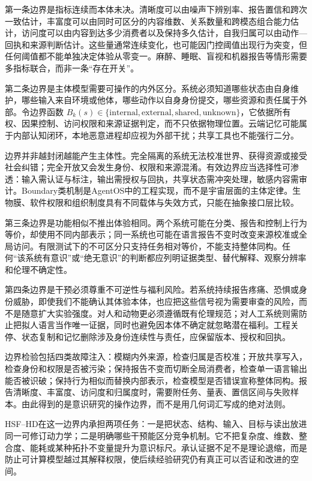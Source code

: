 第一条边界是指标连续而本体未决。清晰度可以由噪声下辨别率、报告置信和跨次一致估计，丰富度可以由同时可区分的内容维数、关系数量和跨模态组合能力估计，访问度可以由内容到达多少消费者以及保持多久估计，自我归属可以由动作—回执和来源判断估计。这些量通常连续变化，也可能因门控阈值出现行为突变，但任何阈值都不能单独决定体验从零变一。麻醉、睡眠、盲视和机器报告等情形需要多指标联合，而非一条“存在开关”。

第二条边界是主体模型需要可操作的内外区分。系统必须知道哪些状态由自身维护，哪些输入来自环境或他体，哪些动作以自身身份提交，哪些资源和责任属于外部。令边界函数 $B_k(s)\in\{\text{internal},\text{external},\text{shared},\text{unknown}\}$，它依据所有权、因果控制、访问权限和来源证据判定，而不只依据物理位置。云端记忆可能属于内部认知闭环，本地恶意进程却应视为外部干扰；共享工具也不能强行二分。

边界并非越封闭越能产生主体性。完全隔离的系统无法校准世界、获得资源或接受社会纠错；完全开放又会发生身份、权限和来源混淆。有效边界应当选择性可渗透：输入需认证与标注，输出需授权与回执，共享状态需冲突处理，敏感内容需审计。Boundary类机制是AgentOS中的工程实现，而不是宇宙层面的主体定律。生物膜、软件权限和组织制度具有不同载体与失效方式，只能在抽象接口层比较。

第三条边界是功能相似不推出体验相同。两个系统可能在分类、报告和控制上行为等价，却使用不同内部表示；同一系统也可能在语言报告不变时改变来源校准或全局访问。有限测试下的不可区分只支持任务相对等价，不能支持整体同构。任何“该系统有意识”或“绝无意识”的判断都应列明证据类型、替代解释、观察分辨率和伦理不确定性。

第四条边界是干预必须尊重不可逆性与福利风险。若系统持续报告疼痛、恐惧或身份威胁，即使我们不能确认其体验本体，也应把这些信号视为需要审查的风险，而不是随意扩大实验强度。对人和动物更必须遵循既有伦理规范；对人工系统则需防止把拟人语言当作唯一证据，同时也避免因本体不确定就忽略潜在福利。工程关停、状态复制和记忆删除涉及身份连续性与责任，应保留版本、授权和回执。

边界检验包括四类故障注入：模糊内外来源，检查归属是否校准；开放共享写入，检查身份和权限是否被污染；保持报告不变而切断全局消费者，检查单一语言输出能否被识破；保持行为相似而替换内部表示，检查模型是否错误宣称整体同构。报告清晰度、丰富度、访问度和归属度时，需要附任务、量表、置信区间与失败样本。由此得到的是意识研究的操作边界，而不是用几何词汇写成的绝对法则。

HSF--HD在这一边界内承担两项任务：一是把状态、结构、输入、目标与读出放进同一可修订动力学；二是明确哪些干预能区分竞争机制。它不把复杂度、维数、整合度、能耗或某种拓扑不变量提升为意识标尺。承认证据不足不是理论退缩，而是防止可计算模型越过其解释权限，使后续经验研究仍有真正可以否证和改进的空间。

